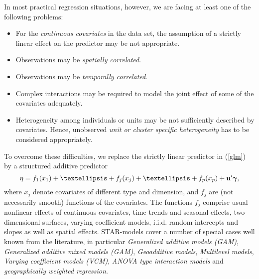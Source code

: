 \documentclass[11pt,a4paper,twoside]{bayesxarticle}
\begin{document}
In most practical regression situations, however, we are facing at
least one of the following problems:
\begin{itemize}
\item For the {\em continuous covariates} in the data set, the assumption of a strictly linear
effect on the predictor may be not appropriate. \vspace{-0.2cm}
\item Observations may be {\em spatially correlated}.
\vspace{-0.2cm}
\item Observations may be {\em temporally correlated}.
\vspace{-0.2cm}
\item Complex interactions may be required to model the joint effect
of some of the covariates adequately. \vspace{-0.2cm}
\item  Heterogeneity among individuals or units may be not sufficiently described by covariates. Hence,
unobserved {\em unit or cluster specific heterogeneity} has to be
considered appropriately.
\end{itemize}
To overcome these difficulties, we replace the strictly linear
predictor in (\ref{glm}) by a structured additive predictor
\begin{equation}
\label{gampred} \eta=f_{1}(x_{1})+\ldots+f_j(x_j) +
\ldots+f_{p}(x_{p})+\uvec'\gammavec,
\end{equation}
where $x_j$ denote
covariates of different type and dimension, and $f_j$ are (not
necessarily smooth) functions of the covariates. The functions $f_j$
comprise usual nonlinear effects of continuous covariates, time
trends and seasonal effects, two-dimensional surfaces, varying
coefficient models, i.i.d. random intercepts and slopes as well as
spatial effects. STAR-models cover a number of special cases
well known from the literature, in particular {\em Generalized additive models (GAM)},
{\em Generalized additive mixed models (GAM)}, {\em Geoadditive models}, {\em Multilevel models},
{\em Varying coefficient models (VCM)}, {\em ANOVA type interaction models} and {\em geographically weighted regression}.
\end{document}
